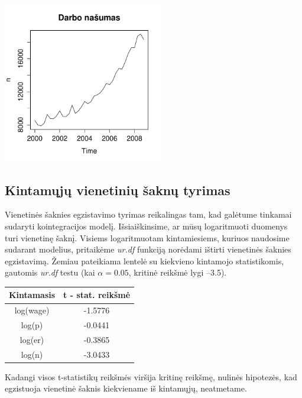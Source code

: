 \documentclass[12pt,a4paper]{article}
\theoremstyle{change}\newtheorem{salyga}{Uždavinys}
\begin{document}
\begin{center}
\includegraphics[width=70mm,height=70mm]{nn}
\end{center}
\vskip 8pt








\subsection{Kintamųjų vienetinių šaknų tyrimas}
\medskip


\hspace{40pt}Vienetinės šaknies egzistavimo tyrimas reikalingas tam, kad galėtume tinkamai sudaryti kointegracijos modelį. Išsiaiškinsime, ar mūsų logaritmuoti duomenys turi vienetinę šaknį. Visiems logaritmuotam kintamiesiems, kuriuos naudosime sudarant modelius, pritaikėme \textit{ur.df} funkciją norėdami ištirti vienetinės šaknies egzistavimą. Žemiau pateikiama lentelė su kiekvieno kintamojo statistikomis, gautomis \textit{ur.df} testu (kai $\alpha =0.05 $, kritinė reikšmė lygi –3.5).

\vskip 15pt

\begin{center}
\begin{tabular}{|c|c|}
\hline\textbf{ Kintamasis} &\textbf{ t - stat. reikšmė }\\ 
\hline log(wage) & -1.5776 \\ 
\hline log(p) & -0.0441 \\ 
\hline log(er) & -0.3865 \\ 
\hline log(n) & -3.0433 \\ 
\hline 
\end{tabular} 
\end{center}
Kadangi visos t-statistikų reikšmės viršija kritinę reikšmę, nulinės hipotezės, kad egzistuoja vienetinė šaknis kiekviename iš kintamųjų, neatmetame. 
\end{document}
